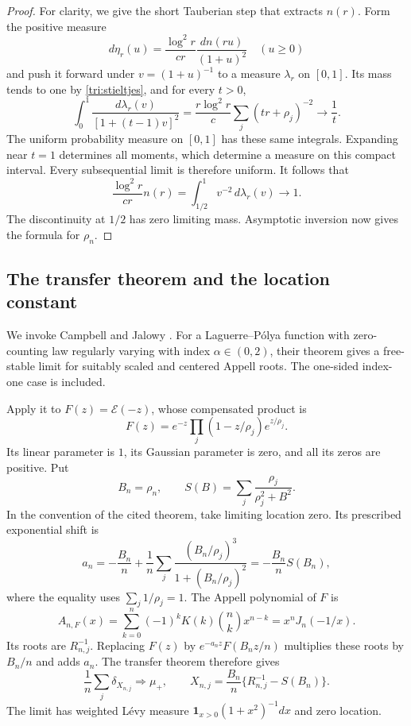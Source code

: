 \begin{proof}
For clarity, we give the short Tauberian step that extracts $n(r)$.
Form the positive measure
\[
 d\eta_r(u)=\frac{\log^2r}{cr}\frac{dn(ru)}{(1+u)^2}
 \quad (u\ge0)
\]
and push it forward under $v=(1+u)^{-1}$ to a measure $\lambda_r$
on $[0,1]$.  Its mass tends to one by \eqref{tri:stieltjes}, and
for every $t>0$,
\[
 \int_0^1\frac{d\lambda_r(v)}{[1+(t-1)v]^2}
 =\frac{r\log^2r}{c}\sum_j(tr+\rho_j)^{-2}
 \longrightarrow\frac1t.
\]
The uniform probability measure on $[0,1]$ has these same integrals.
Expanding near $t=1$ determines all moments, which determine a measure
on this compact interval.  Every subsequential limit is therefore
uniform.  It follows that
\[
 \frac{\log^2r}{cr}n(r)
 =\int_{1/2}^1v^{-2}\,d\lambda_r(v)\longrightarrow1.
\]
The discontinuity at $1/2$ has zero limiting mass.
Asymptotic inversion now gives the formula for $\rho_n$.
\end{proof}

\subsection{The transfer theorem and the location constant}
We invoke Campbell and Jalowy
\cite[Corollary 2.3(2)]{finCampbellJalowy}.
For a Laguerre--Pólya function with zero-counting law regularly varying
with index $\alpha\in(0,2)$, their theorem gives a free-stable limit for
suitably scaled and centered Appell roots.  The one-sided index-one
case is included.

Apply it to $F(z)=\mathcal E(-z)$, whose compensated product is
\[
 F(z)=e^{-z}\prod_j(1-z/\rho_j)e^{z/\rho_j}.
\]
Its linear parameter is $1$, its Gaussian parameter is zero,
and all its zeros are positive.  Put
\[
 B_n=\rho_n,\qquad
 S(B)=\sum_j\frac{\rho_j}{\rho_j^2+B^2}.
\]
In the convention of the cited theorem, take limiting location zero.
Its prescribed exponential shift is
\[
 a_n=-\frac{B_n}{n}
   +\frac1n\sum_j
       \frac{(B_n/\rho_j)^3}{1+(B_n/\rho_j)^2}
   =-\frac{B_n}{n}S(B_n),
\]
where the equality uses $\sum_j1/\rho_j=1$.
The Appell polynomial of $F$ is
\[
 A_{n,F}(x)=\sum_{k=0}^n(-1)^kK(k)\binom nkx^{n-k}
          =x^nJ_n(-1/x).
\]
Its roots are $R_{n,j}^{-1}$.  Replacing $F(z)$ by
$e^{-a_nz}F(B_nz/n)$ multiplies these roots by $B_n/n$
and adds $a_n$.  The transfer theorem therefore gives
\begin{equation}\label{tri:appelllimit}
 \frac1n\sum_j\delta_{X_{n,j}}\Longrightarrow\mu_+,\qquad
 X_{n,j}=\frac{B_n}{n}\{R_{n,j}^{-1}-S(B_n)\}.
\end{equation}
The limit has weighted Lévy measure
$\mathbf{1}_{x>0}(1+x^2)^{-1}dx$ and zero location.

